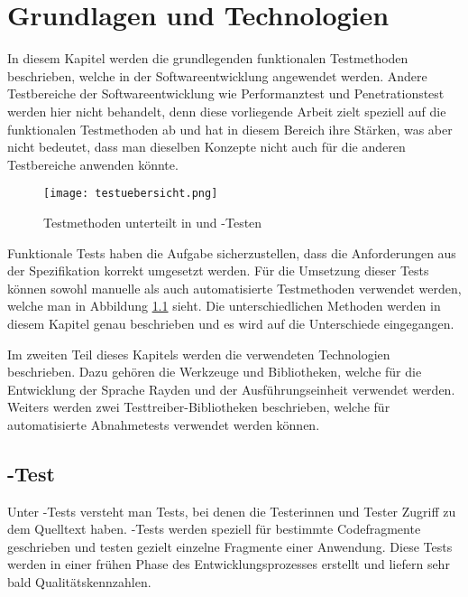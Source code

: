 \chapter{Grundlagen und Technologien}
\label{cha:StandDerTechnik}

In diesem Kapitel werden die grundlegenden funktionalen Testmethoden beschrieben, welche in der Softwareentwicklung angewendet werden. Andere Testbereiche der Softwareentwicklung wie Performanztest und Penetrationstest werden hier nicht behandelt, denn diese vorliegende Arbeit zielt speziell auf die funktionalen Testmethoden ab und hat in diesem Bereich ihre Stärken, was aber nicht bedeutet, dass man dieselben Konzepte nicht auch für die anderen Testbereiche anwenden könnte. 


\begin{figure}
\centering
\texttt{[image: testuebersicht.png]}
\caption{Testmethoden unterteilt in  und -Testen}
\label{fig:testtypen}
\end{figure}

\SuperPar
Funktionale Tests haben die Aufgabe sicherzustellen, dass die Anforderungen aus der Spezifikation korrekt umgesetzt werden. Für die Umsetzung dieser Tests können sowohl manuelle als auch automatisierte Testmethoden verwendet werden, welche man in Abbildung \ref{fig:testtypen} sieht. Die unterschiedlichen Methoden werden in diesem Kapitel genau beschrieben und es wird auf die Unterschiede eingegangen.

\SuperPar
Im zweiten Teil dieses Kapitels werden die verwendeten Technologien beschrieben. Dazu gehören die Werkzeuge und Bibliotheken, welche für die Entwicklung der Sprache Rayden und der Ausführungseinheit verwendet werden. Weiters werden zwei Testtreiber-Bibliotheken beschrieben, welche für automatisierte Abnahmetests verwendet werden können. 

\section{-Test}

Unter -Tests versteht man Tests, bei denen die Testerinnen und Tester Zugriff zu dem Quelltext haben. -Tests werden speziell für bestimmte Codefragmente geschrieben und testen gezielt einzelne Fragmente einer Anwendung. Diese Tests werden in einer frühen Phase des Entwicklungsprozesses erstellt und liefern sehr bald Qualitätskennzahlen. 

